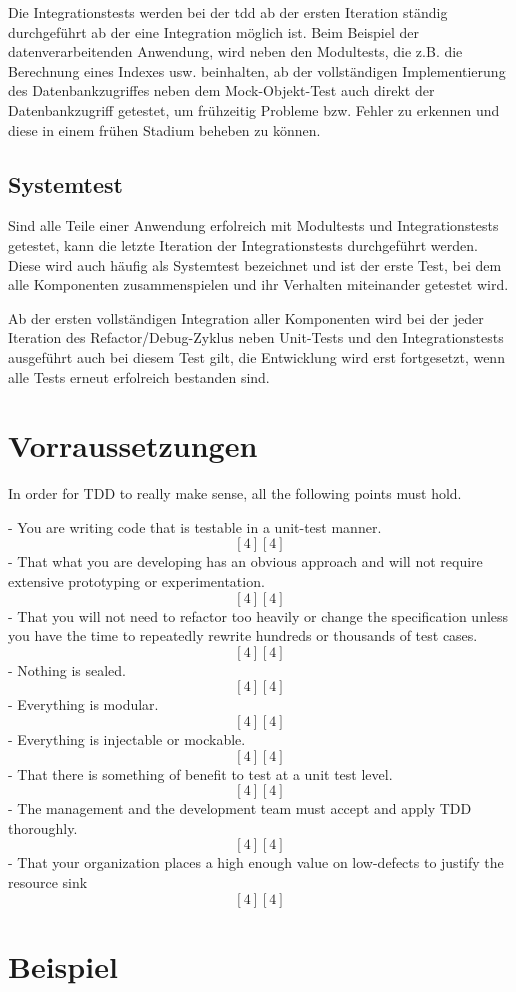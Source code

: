 \documentclass{mitschrift}
\newcommand{\pje}{\marginpar{Philipp\\Jeske}}
\newcommand{\bmn}{\marginpar{Benjamin\\Morgan}}
\begin{document}
Die Integrationstests werden bei der \gls{tdd} ab der ersten Iteration ständig
durchgeführt ab der eine Integration möglich ist. Beim Beispiel der
datenverarbeitenden Anwendung, wird neben den Modultests, die z.B. die
Berechnung eines Indexes usw. beinhalten, ab der vollständigen Implementierung
des Datenbankzugriffes neben dem Mock-Objekt-Test auch direkt der
Datenbankzugriff getestet, um frühzeitig Probleme bzw. Fehler zu erkennen und
diese in einem frühen Stadium beheben zu können.

\section{Systemtest}
Sind alle Teile einer Anwendung erfolreich mit Modultests und Integrationstests
getestet, kann die letzte Iteration der Integrationstests durchgeführt werden.
Diese wird auch häufig als Systemtest bezeichnet und ist der erste Test, bei
dem alle Komponenten zusammenspielen und ihr Verhalten miteinander getestet
wird.

Ab der ersten vollständigen Integration aller Komponenten wird bei der jeder
Iteration des Refactor/Debug-Zyklus neben Unit-Tests und den Integrationstests
ausgeführt auch bei diesem Test gilt, die Entwicklung wird erst fortgesetzt,
wenn alle Tests erneut erfolreich bestanden sind.

\chapter{Vorraussetzungen}
\bmn
In order for TDD to really make sense, all the following points must hold.

 - You are writing code that is testable in a unit-test manner. \[[4][4]\]
 - That what you are developing has an obvious approach and will not require
   extensive prototyping or experimentation. \[[4][4]\]
 - That you will not need to refactor too heavily or change the
   specification unless you have the time to repeatedly rewrite hundreds
   or thousands of test cases. \[[4][4]\]
 - Nothing is sealed. \[[4][4]\]
 - Everything is modular. \[[4][4]\]
 - Everything is injectable or mockable. \[[4][4]\]
 - That there is something of benefit to test at a unit test level. \[[4][4]\]
 - The management and the development team must accept and apply TDD
   thoroughly. \[[4][4]\]
 - That your organization places a high enough value on low-defects to
   justify the resource sink \[[4][4]\]


\chapter{Beispiel}
\pje
\end{document}
